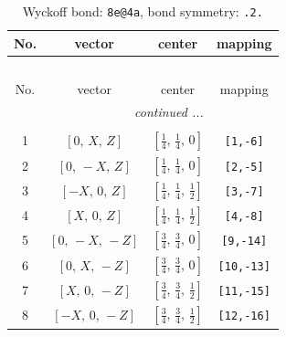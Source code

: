 \documentclass[fleqn,8pt]{jsarticle}
\begin{document}
\begin{longtable}{cccc}
\caption{Wyckoff bond: {\tt 8e@4a}, bond symmetry: {\tt .2.}}
 \\
 \hline \hline
No. & vector & center & mapping \\ \hline \endfirsthead

\multicolumn{3}{l}{\tablename\ \thetable{}} \\
 \hline \hline
No. & vector & center & mapping \\ \hline \endhead

 \hline \hline
\multicolumn{3}{r}{\footnotesize\it continued ...} \\ \endfoot

 \hline \hline
\multicolumn{3}{r}{} \\ \endlastfoot

1 & $\left[ 0,\, X,\, Z \right]$ & $\left[ \frac{1}{4},\, \frac{1}{4},\, 0 \right]$ & {\tt [1,-6]} \\ \hline
2 & $\left[ 0,\, - X,\, Z \right]$ & $\left[ \frac{1}{4},\, \frac{1}{4},\, 0 \right]$ & {\tt [2,-5]} \\ \hline
3 & $\left[ - X,\, 0,\, Z \right]$ & $\left[ \frac{1}{4},\, \frac{1}{4},\, \frac{1}{2} \right]$ & {\tt [3,-7]} \\ \hline
4 & $\left[ X,\, 0,\, Z \right]$ & $\left[ \frac{1}{4},\, \frac{1}{4},\, \frac{1}{2} \right]$ & {\tt [4,-8]} \\ \hline
5 & $\left[ 0,\, - X,\, - Z \right]$ & $\left[ \frac{3}{4},\, \frac{3}{4},\, 0 \right]$ & {\tt [9,-14]} \\ \hline
6 & $\left[ 0,\, X,\, - Z \right]$ & $\left[ \frac{3}{4},\, \frac{3}{4},\, 0 \right]$ & {\tt [10,-13]} \\ \hline
7 & $\left[ X,\, 0,\, - Z \right]$ & $\left[ \frac{3}{4},\, \frac{3}{4},\, \frac{1}{2} \right]$ & {\tt [11,-15]} \\ \hline
8 & $\left[ - X,\, 0,\, - Z \right]$ & $\left[ \frac{3}{4},\, \frac{3}{4},\, \frac{1}{2} \right]$ & {\tt [12,-16]} \\
\end{longtable}
\renewcommand{\arraystretch}{1.2}
\end{document}
